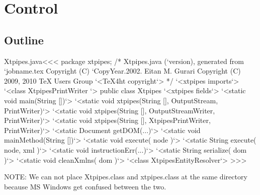\documentclass{article}
\begin{document}
{%
\section{Control}


\subsection{Outline}





 {}{
}


 {
    \def\BIN{}
}{
    \def\BIN{(/home/4/gurari/xtpipes.dir)}
}

% 
\expandafter\AddFile{}


\<Xtpipes.java\><<<
package xtpipes;
/* Xtpipes.java (`version), generated from `jobname.tex
   Copyright (C) `CopyYear.2002. Eitan M. Gurari
   Copyright (C) 2009, 2010 TeX Users Group
`<TeX4ht copyright`> */
`<xtpipes imports`>
`<class XtpipesPrintWriter  `>
public class Xtpipes {
   `<xtpipes fields`>
   `<static void main(String [])`>
   `<static void xtpipes(String [], OutputStream, PrintWriter)`>
   `<static void xtpipes(String [], OutputStreamWriter, PrintWriter)`>
   `<static void xtpipes(String [], XtpipesPrintWriter, PrintWriter)`>
   `<static Document getDOM(...)`>
   `<static void mainMethod(String [])`>
   `<static void execute( node )`>
   `<static String execute( node, xml )`>
   `<static void instructionErr(...)`>
   `<static String serialize( dom )`>
   `<static void cleanXmlns( dom )`>
}
`<class XtpipesEntityResolver`>
>>>


NOTE: We can not place Xtpipes.class and xtpipes.class at the same
directory because MS Windows get confused between the two.


}
\end{document}
